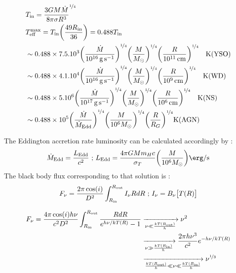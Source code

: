 \documentclass[10pt,a4paper,english]{article}
\let\originalleft\left
\let\originalright\right
\renewcommand{\left}{\mathopen{}\mathclose\bgroup\originalleft}
\renewcommand{\right}{\aftergroup\egroup\originalright}
\begin{document}
\begin{align}
    & T_\mathrm{in} = \frac{3GM\dot{M}}{8\pi\sigma R^3}^{\nicefrac{1}{4}} \\
    & T^\mathrm{max}_\mathrm{eff} = T_\mathrm{in} \left(\frac{49 R_\mathrm{in}}{36}\right) = 0.488T_\mathrm{in} \\
    & \sim 0.488\times7.5.10^3 \left( \frac{\dot{M}}{\SI{e16}{\gram \per \s}}\right)^{\nicefrac{1}{4}}
    \left( \frac{M}{M_{\odot}}\right)^{\nicefrac{1}{4}}
    \left(  \frac{R}{\SI{e11}{\cm}}\right)^{\nicefrac{1}{4}} \quad \text{K(YSO)}     \\
    & \sim 0.488\times 4.1.10^4 \left( \frac{\dot{M}}{\SI{e16}{\gram \per \s}}\right)^{\nicefrac{1}{4}}
    \left( \frac{M}{M_{\odot}}\right)^{\nicefrac{1}{4}}
    \left(  \frac{R}{\SI{e9}{\cm}}\right)^{\nicefrac{1}{4}} \quad \text{K(WD)}     \\
    & \sim 0.488\times 5.10^6  \left( \frac{\dot{M}}{\SI{e17}{\gram \per \s}}\right)^{\nicefrac{1}{4}}
    \left( \frac{M}{M_{\odot}}\right)^{\nicefrac{1}{4}}
    \left(  \frac{R}{\SI{e6}{\cm}}\right)^{\nicefrac{1}{4}} \quad \text{K(NS)}     \\
    &\sim 0.488 \times 10^5 \left(  \frac{\dot{M}}{\dot{M}_\mathrm{Edd}}\right)^{\nicefrac{1}{4}}
    \left( \frac{M}{10^6 M_{\odot}}\right)^{\nicefrac{1}{4}}
    \left(  \frac{R}{R_G}\right)^{\nicefrac{1}{4}} \text{K(AGN)}
\end{align}

The Eddington accretion rate luminosity can be calculated accordingly by :
\begin{equation}
    \dot{M}_\mathrm{Edd} = \frac{L_\mathrm{Edd}}{c^2} \text{ ; } L_\mathrm{Edd} = \frac{4\pi GMm_Hc}{\sigma_T}
    \left( \frac{M}{10^6M_{\odot}}\right) \si{\erg \per \s}
\end{equation}
The black body flux corresponding to that solution is :
\begin{equation}
    F_{\nu} = \frac{2\pi \cos (i)}{D^2} \int_{R_\mathrm{in}}^{R_\mathrm{out}} I_{\nu}RdR \text{  ;  }
    I_{\nu} = B_{\nu}\big[ T(R)\big] \\
\end{equation}

\begin{align}
    F_{\nu} = \frac{4\pi \cos (i)h\nu}{c^2D^2} \int_{R_\mathrm{in}}^{R_\mathrm{out}}
    \frac{RdR}{e^{h\nu/kT(R)}-1}
    &\xrightarrow[\nu \ll \frac{kT(R_\mathrm{out})}{h}]{} \nu^2  \\
    & \xrightarrow[\nu \gg \frac{kT(R_\mathrm{in})}{h}]{} \frac{2\pi h \nu^3}{c^2} e^{-h\nu/kT(R)}  \\
    & \xrightarrow[\frac{kT(R_\mathrm{out})}{h}\ll\nu \ll \frac{kT(R_\mathrm{in})}{h}]{} \nu^{\nicefrac{1}{3}}
\end{align}
\end{document}
